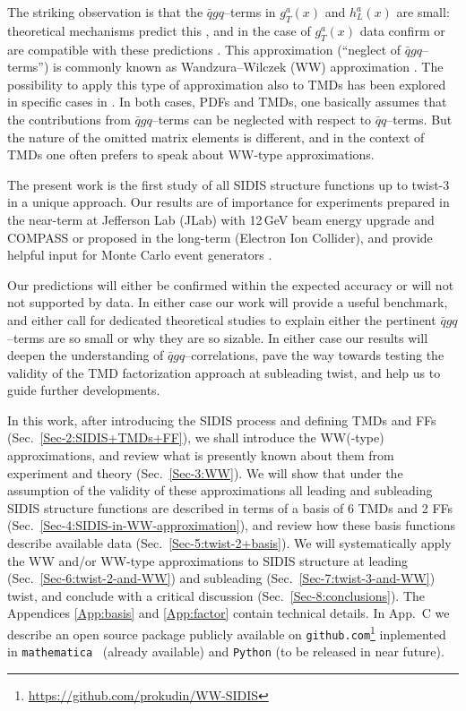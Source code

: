 \documentclass[a4paper,11pt]{article}
\newcommand{\blue}[1]{{\color{blue} #1}}
\newcommand{\ps}[1]{\blue{ #1}}
\begin{document}
The striking observation is that the $\bar{q}gq$--terms in $g_T^a(x)$ 
and $h_L^a(x)$ are small: theoretical mechanisms predict this 
\cite{Balla:1997hf,Dressler:1999hc,Gockeler:2000ja,Gockeler:2005vw}, 
and in the case of $g_T^a(x)$ data confirm or are compatible with these 
predictions \cite{Abe:1998wq,Anthony:2002hy,Airapetian:2011wu}.
This approximation (``neglect of $\bar{q}gq$--terms'') is commonly 
known as Wandzura--Wilczek (WW) approximation \cite{Wandzura:1977qf}.
The possibility to apply this type of approximation also to TMDs has 
been explored in specific cases in \cite{Kotzinian:1995cz,Kotzinian:1997wt,
Kotzinian:2006dw,Avakian:2007mv,Metz:2008ib,Teckentrup:2009tk,Tangerman:1994bb}.
In both cases, PDFs and TMDs, one basically assumes that the 
contributions from $\bar{q}gq$--terms can be neglected with respect to 
$\bar{q}q$--terms. But the nature of the omitted matrix elements is 
different, and in the context of TMDs one often prefers to speak 
about WW-type approximations.

The present work is the first study of all SIDIS structure functions up to 
twist-3 in a unique approach. Our results are of importance for experiments 
prepared in the near-term at Jefferson Lab (JLab) with 12$\,$GeV beam energy
upgrade and COMPASS or proposed in the long-term (Electron Ion Collider), 
and provide helpful input for Monte Carlo event generators 
\cite{Avakian:2015vha}.

Our predictions will either be confirmed within the expected accuracy
or will not not supported by data. In either case our work will provide
a useful benchmark, and either call for dedicated theoretical 
studies to explain either the pertinent $\bar{q}gq$--terms are 
so small or why they are so sizable. In either case our results will 
deepen the understanding of  $\bar{q}gq$--correlations, \ps{pave the 
way towards testing} the validity of the TMD factorization approach 
at subleading twist, and help us to guide further developments.

In this work, after introducing the SIDIS process and defining TMDs and 
FFs (Sec.~\ref{Sec-2:SIDIS+TMDs+FF}), we shall introduce the WW(-type) 
approximations, and review what is presently known about them 
from experiment and theory (Sec.~\ref{Sec-3:WW}).
We will show that under the assumption of the validity of these approximations 
all leading and subleading SIDIS structure functions are described in terms of 
a basis of 6 TMDs and 2 FFs (Sec.~\ref{Sec-4:SIDIS-in-WW-approximation}),
and review how these basis functions describe available data 
(Sec.~\ref{Sec-5:twist-2+basis}).
We will systematically apply the WW and/or WW-type approximations
to SIDIS structure at leading (Sec.~\ref{Sec-6:twist-2-and-WW}) 
and subleading (Sec.~\ref{Sec-7:twist-3-and-WW}) twist, and
conclude with a critical discussion (Sec.~\ref{Sec-8:conclusions}).
The Appendices \ref{App:basis} and \ref{App:factor} contain 
technical details. \ps{In App.~C we describe an open source 
package publicly available on \texttt{github.com}\footnote{\href{%
	https://github.com/prokudin/WW-SIDIS}{
	https://github.com/prokudin/WW-SIDIS}} 
	inplemented in \texttt{mathematica}~\cite{Mathematica} 
	(already available) and \texttt{Python} 
	(to be released in near future).}
\end{document}
